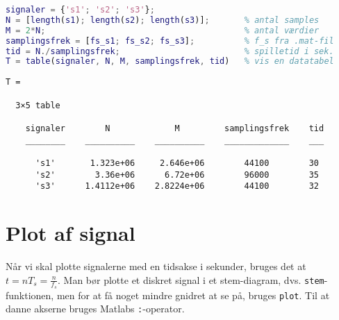 \documentclass[a4paper]{report}
\begin{document}
\begin{lstlisting}[language=Matlab, style=Matlab-editor]
signaler = {'s1'; 's2'; 's3'};
N = [length(s1); length(s2); length(s3)];       % antal samples
M = 2*N;                                        % antal værdier
samplingsfrek = [fs_s1; fs_s2; fs_s3];          % f_s fra .mat-fil
tid = N./samplingsfrek;                         % spilletid i sek.
T = table(signaler, N, M, samplingsfrek, tid)   % vis en datatabel
\end{lstlisting}

        \color{lightgray} \begin{verbatim}
T =

  3×5 table

    signaler        N             M         samplingsfrek    tid
    ________    __________    __________    _____________    ___

      's1'       1.323e+06     2.646e+06        44100        30 
      's2'        3.36e+06      6.72e+06        96000        35 
      's3'      1.4112e+06    2.8224e+06        44100        32 

\end{verbatim} \color{black}
    


\section{Plot af signal}

        \begin{par}

Når vi skal plotte signalerne med en tidsakse i sekunder, bruges det at
$t = n T_s = \frac{n}{f_s}$. Man bør plotte et diskret signal i et
stem-diagram, dvs. \texttt{stem}-funktionen, men for at få noget mindre
gnidret at se på, bruges \texttt{plot}. Til at danne akserne bruges
Matlabs \texttt{:}-operator.\\\\

\end{par} 
\end{document}
